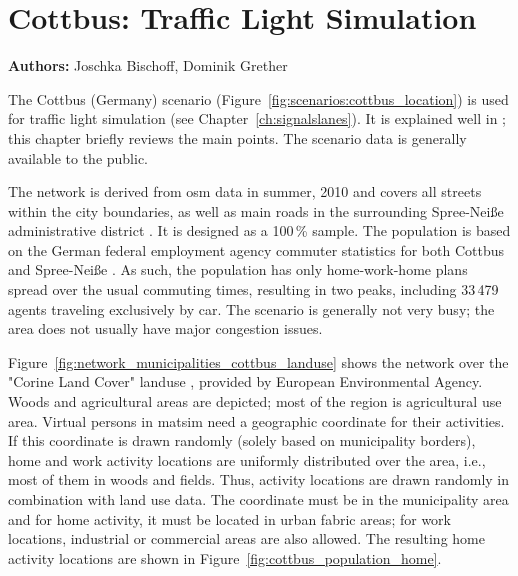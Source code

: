 \section{Cottbus: Traffic Light Simulation}
\label{ch:scenarios:cottbus}
\hfill \textbf{Authors:} Joschka Bischoff, Dominik Grether


The Cottbus (Germany) scenario (Figure~\ref{fig:scenarios:cottbus_location}) is used for traffic light simulation (see Chapter~\ref{ch:signalslanes}). 
It is explained well in \citet[][pp.~87]{Grether_PhDThesis_2014}; this chapter briefly reviews the main points. 
The scenario data is generally available to the public.

The network is derived from \gls{osm} data in summer, 2010 \citep{Bischoff2010BaSylvia} and 
covers all streets within the city boundaries, as well as main roads in the surrounding Spree-Neiße administrative district . 
It is designed as a 100\,\% sample. 
The population is based on the German federal employment agency commuter statistics for both Cottbus and Spree-Neiße \citep{WiethoelterBogaiCarstensen2010IABPendlerberichtBB}. 
As such, the population has only home-work-home plans spread over the usual commuting times, resulting in two peaks, including 
33\,479 agents traveling exclusively by car. 
The scenario is generally not very busy; the area does not usually have major congestion issues.

Figure~\ref{fig:network_municipalities_cottbus_landuse} shows the network over the 
"Corine Land Cover" landuse \citep{CorineLandCover2006Data}, provided by European Environmental Agency. 
Woods and agricultural areas are depicted; most of the region is agricultural use area.  
Virtual persons in \gls{matsim} need a geographic coordinate for their activities. 
If this coordinate is drawn randomly (solely based on municipality borders), home and work activity locations are uniformly distributed over  the area, i.e.,\,most of them in woods and fields. 
Thus, activity locations are drawn randomly in combination with land use data. 
The coordinate must be in the municipality area and for home activity, it must be located in urban fabric areas; for work locations, industrial or commercial areas are also allowed. 
The resulting home activity locations are shown in Figure~\ref{fig:cottbus_population_home}. 

